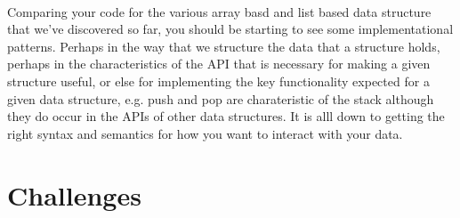 \documentclass[10pt, a4paper, twosize]{article}
\begin{document}
\paragraph{} Comparing your code for the various array basd and list based data structure that we've discovered so far, you should be starting to see some implementational patterns. Perhaps in the way that we structure the data that a structure holds, perhaps in the characteristics of the API that is necessary for making a given structure useful, or else for implementing the key functionality expected for a given data structure, e.g. push and pop are charateristic of the stack although they do occur in the APIs of other data structures. It is alll down to getting the right syntax and semantics for how you want to interact with your data.

\section{Challenges}
\paragraph{} 
\end{document}

